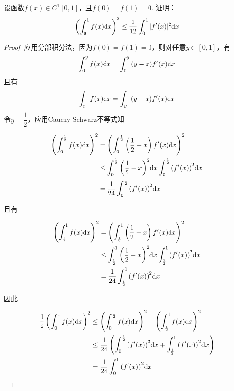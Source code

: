 \begin{proposition}
    
    设函数$f(x) \in C^1[0, 1]$，且$f(0) = f(1) = 0$. 证明：
    \[\left( \int_{0}^{1}{f(x)}\mathrm{d} x \right)^2 \leq \dfrac{1}{12} \int_{0}^{1}{|f'(x)|^2}\mathrm{d} x\]

\end{proposition}

\begin{proof}

    应用分部积分法，因为$f(0) = f(1) = 0$，则对任意$y \in [0, 1]$，有
    \[\int_{0}^{y}{f(x)}\mathrm{d} x = \int_{0}^{y}{(y - x)f'(x)}\mathrm{d} x\]
    且有
    \[\int_{y}^{1}{f(x)}\mathrm{d} x = \int_{y}^{1}{(y - x)f'(x)}\mathrm{d} x\]
    令$y = \dfrac{1}{2}$，应用\textup{Cauchy-Schwarz}不等式知
    
    \begin{align*}
        \left( \int_{0}^{\frac{1}{2}}{f(x)}\mathrm{d} x \right)^2 & = \left( \int_{0}^{\frac{1}{2}}{\left( \dfrac{1}{2} - x \right)f'(x)}\mathrm{d} x \right)^2 \\
        & \leq \int_{0}^{\frac{1}{2}}{\left( \dfrac{1}{2} - x \right)^2}\mathrm{d} x \int_{0}^{\frac{1}{2}}{\left( f'(x) \right)^2}\mathrm{d} x \\
        & = \dfrac{1}{24} \int_{0}^{\frac{1}{2}}{\left( f'(x) \right)^2}\mathrm{d} x
    \end{align*}

    且有

    \begin{align*}
        \left( \int_{\frac{1}{2}}^{1}{f(x)}\mathrm{d} x \right)^2 & = \left( \int_{\frac{1}{2}}^{1}{\left( \dfrac{1}{2} - x \right)f'(x)}\mathrm{d} x \right)^2 \\
        & \leq \int_{\frac{1}{2}}^{1}{\left( \dfrac{1}{2} - x \right)^2}\mathrm{d} x \int_{\frac{1}{2}}^{1}{\left( f'(x) \right)^2}\mathrm{d} x \\
        & = \dfrac{1}{24} \int_{\frac{1}{2}}^{1}{\left( f'(x) \right)^2}\mathrm{d} x
    \end{align*}

    因此

    \begin{align*}
        \dfrac{1}{2} \left( \int_{0}^{1}{f(x)}\mathrm{d} x \right)^2 & \leq \left( \int_{0}^{\frac{1}{2}}{f(x)}\mathrm{d} x \right)^2 + \left( \int_{\frac{1}{2}}^{1}{f(x)}\mathrm{d} x \right)^2 \\
        & \leq \dfrac{1}{24} \left( \int_{0}^{\frac{1}{2}}{\left( f'(x) \right)^2}\mathrm{d} x + \int_{\frac{1}{2}}^{1}{\left( f'(x) \right)^2}\mathrm{d} x \right) \\
        & = \dfrac{1}{24} \int_{0}^{1}{\left( f'(x) \right)^2}\mathrm{d} x
    \end{align*}

\end{proof}
